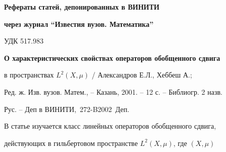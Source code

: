

















\setcounter{page}{80}


\pagestyle{plain}










\par


{\centerline{\bf Рефераты статей, депонированных в ВИНИТИ}}





{\centerline{\bf через журнал ``Известия вузов. Математика''}}


\bigskip


\bigskip





{\hfill {УДК 517.983}}





{\bf О характеристических свойствах операторов обобщенного сдвига


в пространствах $L^2(X,\mu)$ / Александров Е.Л., Хеббеш А.;


Ред. ж. Изв. вузов. Матем., -- Казань, 2001. -- 12 с. -- Библиогр. 2 назв.


Рус. -- Деп в ВИНИТИ, \No\,272-B2002~Деп.}


\medskip





В статье изучается класс линейных операторов обобщенного сдвига,


действующих в гильбертовом пространстве $L^2(X,\mu)$, где $(X,\mu)$


